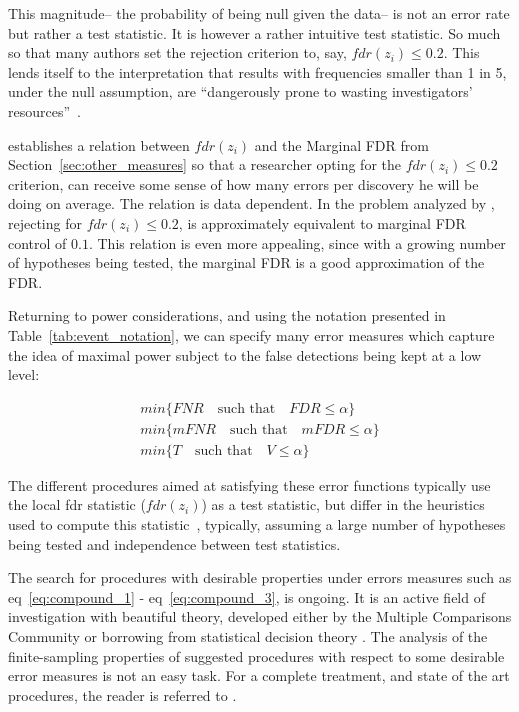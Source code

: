 \documentclass[review,12pt]{article}
\theoremstyle{definition}
\theoremstyle{definition}
\begin{document}
This magnitude-- the probability of being null given the data-- is not an error rate but rather a test statistic. It is however a rather intuitive test statistic. So much so that many authors set the rejection criterion to, say, $fdr(z_i)\leq 0.2$. This lends itself to the interpretation that results with frequencies smaller than 1 in 5, under the null assumption, are ``dangerously prone to wasting investigators' resources''~\cite{efron_microarrays_2008}. 


\citet{storey_positive_2003} establishes a relation between $fdr(z_i)$ and the Marginal FDR from Section~\ref{sec:other_measures} so that a researcher opting for the $fdr(z_i)\leq 0.2$ criterion, can receive some sense of how many errors per discovery he will be doing on average.  The relation is data dependent. In the problem analyzed by \citet{efron_microarrays_2008}, rejecting for $fdr(z_i)\leq 0.2$, is approximately equivalent to marginal FDR control of $0.1$.
This relation is even more appealing, since with a growing number of hypotheses being tested, the marginal FDR is a good approximation of the FDR. 

Returning to power considerations, and using the notation presented in Table~\ref{tab:event_notation}, we can specify many error measures which capture the idea of maximal power subject to the false detections being kept at a low level:

\begin{align}
        min\{FNR \quad \text{such that} \quad FDR\leq \alpha \} \label{eq:compound_1}\\
	min\{mFNR \quad \text{such that} \quad mFDR\leq \alpha \} \label{eq:compound_2}\\
	min\{T \quad \text{such that} \quad V \leq \alpha \} \label{eq:compound_3}
\end{align}


The different procedures aimed at satisfying these error functions typically use the local fdr statistic ($fdr(z_i)$) as a test statistic, but differ in the heuristics used to  compute this statistic~\cite[eg.][]{storey_direct_2002,efron_microarrays_2008,sun_oracle_2007}, typically, assuming a large number of hypotheses being tested and independence between test statistics. 

The search for procedures with desirable properties under errors measures such as eq~\ref{eq:compound_1}  - eq~\ref{eq:compound_3}, is ongoing. It is an active field of investigation with beautiful theory, developed either by the Multiple Comparisons Community or borrowing from statistical decision theory \cite[see][]{sun_oracle_2007}. The analysis of the finite-sampling properties of suggested procedures with respect to some desirable error measures is not an easy task.  For a complete treatment, and state of the art procedures, the reader is referred to \cite{efron_large-scale_2010}.
\end{document}
